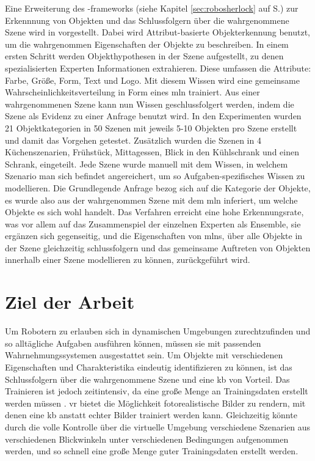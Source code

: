 Eine Erweiterung des \robosherlock-\glspl{framework} (siehe Kapitel \ref{sec:robosherlock} auf S.\pageref{sec:robosherlock}) zur Erkennnung von Objekten und das Schlussfolgern über die wahrgenommene Szene wird in \cite{pr2looking} vorgestellt. Dabei wird Attribut-basierte Objekterkennung benutzt, um die wahrgenommen Eigenschaften der Objekte zu beschreiben. In einem ersten Schritt werden Objekthypothesen in der Szene aufgestellt, zu denen spezialisierten Experten Informationen extrahieren. Diese umfassen die Attribute: Farbe, Größe, Form, Text und Logo. Mit diesem Wissen wird eine gemeinsame Wahrscheinlichkeitsverteilung in Form eines \gls{mln} trainiert. Aus einer wahrgenommenen Szene kann nun Wissen geschlussfolgert werden, indem die Szene als Evidenz zu einer Anfrage benutzt wird. In den Experimenten wurden 21 Objektkategorien in 50 Szenen mit jeweils 5-10 Objekten pro Szene erstellt und damit das Vorgehen getestet. Zusätzlich wurden die Szenen in 4 Küchenszenarien, Frühstück, Mittagessen, Blick in den Kühlschrank und einen Schrank, eingeteilt. Jede Szene wurde manuell mit dem Wissen, in welchem Szenario man sich befindet angereichert, um so Aufgaben-spezifisches Wissen zu modellieren. Die Grundlegende Anfrage bezog sich auf die Kategorie der Objekte, es wurde also aus der wahrgenommen Szene mit dem \gls{mln} inferiert, um welche Objekte es sich wohl handelt. Das Verfahren erreicht eine hohe Erkennungsrate, was vor allem auf das Zusammenspiel der einzelnen Experten als Ensemble, sie ergänzen sich gegenseitig, und die Eigenschaften von \glspl{mln}, über alle Objekte in der Szene gleichzeitig schlussfolgern und das gemeinsame Auftreten von Objekten innerhalb einer Szene modellieren zu können, zurückgeführt wird.

\section{Ziel der Arbeit}
\label{sec:goal}

Um Robotern zu erlauben sich in dynamischen Umgebungen zurechtzufinden und so alltägliche Aufgaben ausführen können, müssen sie mit passenden Wahrnehmungssystemen ausgestattet sein. Um Objekte mit verschiedenen Eigenschaften und Charakteristika eindeutig identifizieren zu können, ist das Schlussfolgern über die wahrgenommene Szene und eine \gls{kb} von Vorteil. Das Trainieren ist jedoch zeitintensiv, da eine große Menge an Trainingsdaten erstellt werden müssen \cite{burger1995}. \gls{vr} bietet die Möglichkeit fotorealistische Bilder zu rendern, mit denen eine \gls{kb} anstatt echter Bilder trainiert werden kann. Gleichzeitig könnte durch die volle Kontrolle über die virtuelle Umgebung verschiedene Szenarien aus verschiedenen Blickwinkeln unter verschiedenen Bedingungen aufgenommen werden, und so schnell eine große Menge guter Trainingsdaten erstellt werden. \par 

